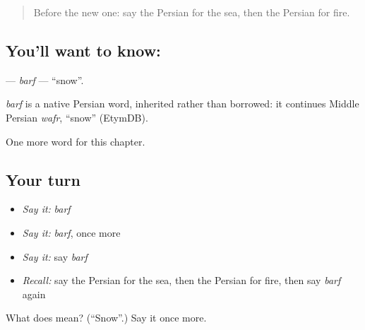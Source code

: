 \label{lesson:FA-C53-barf}



\begin{quote}
Before the new one: say the Persian for the sea, then the Persian for fire.
\end{quote}

\subsection*{You'll want to know: }
\textbf{} — \emph{barf} — \textquotedblleft{}snow\textquotedblright{}.

\begin{cousinweb}
\emph{barf} is a native Persian word, inherited rather than borrowed: it continues Middle Persian \emph{wafr}, \textquotedblleft{}snow\textquotedblright{} (EtymDB).
\end{cousinweb}

\begin{grammarlens}[title={What you've built}]
One more word for this chapter.
\end{grammarlens}

\subsection*{Your turn}
\begin{itemize}
\raggedright
  \item \emph{Say it:} \emph{barf}
  \item \emph{Say it:} \emph{barf}, once more
  \item \emph{Say it:} say \emph{barf}
  \item \emph{Recall:} say the Persian for the sea, then the Persian for fire, then say \emph{barf} again
\end{itemize}

\begin{tcolorbox}[breakable,colback=teal!4,colframe=teal!35!black,title={Before you move on}]
What does  mean? (\textquotedblleft{}Snow\textquotedblright{}.) Say it once more.
\end{tcolorbox}
